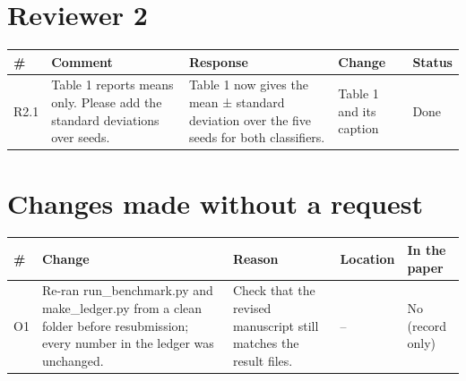 \documentclass[10pt]{article}
\begin{document}
\section*{Reviewer 2}
{\small\begin{longtable}{@{}P{0.9cm}P{4.4cm}P{6.6cm}P{2.6cm}P{1.5cm}@{}}
\toprule
\textbf{\#} & \textbf{Comment} & \textbf{Response} & \textbf{Change} & \textbf{Status} \\ \midrule
\endhead
\bottomrule
\endfoot
R2.1 & Table 1 reports means only. Please add the standard deviations over seeds. & Table 1 now gives the mean ± standard deviation over the five seeds for both classifiers. & Table 1 and its caption & Done \\ \midrule
\end{longtable}}
\section*{Changes made without a request}
{\small\begin{longtable}{@{}P{0.9cm}P{6cm}P{4.6cm}P{2.4cm}P{2cm}@{}}
\toprule
\textbf{\#} & \textbf{Change} & \textbf{Reason} & \textbf{Location} & \textbf{In the paper} \\ \midrule
\endhead
\bottomrule
\endfoot
O1 & Re-ran run\_benchmark.py and make\_ledger.py from a clean folder before resubmission; every number in the ledger was unchanged. & Check that the revised manuscript still matches the result files. & -- & No (record only) \\ \midrule
\end{longtable}}
\end{document}
